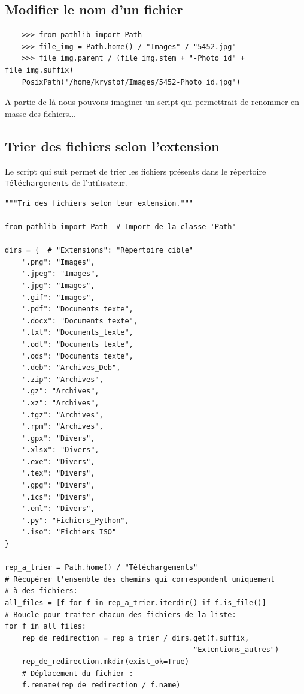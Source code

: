 \documentclass[a4paper,11pt]{book}
\begin{document}
\subsection*{Modifier le nom d'un fichier}
\begin{verbatim}
    >>> from pathlib import Path
    >>> file_img = Path.home() / "Images" / "5452.jpg"
    >>> file_img.parent / (file_img.stem + "-Photo_id" + file_img.suffix)
    PosixPath('/home/krystof/Images/5452-Photo_id.jpg')
\end{verbatim}
\medskip

A partie de là nous pouvons imaginer un script qui permettrait de renommer en masse des fichiers...
\medskip

\subsection*{Trier des fichiers selon l'extension}
Le script qui suit permet de trier les fichiers présents dans le répertoire \texttt{Téléchargements} de l'utilisateur.
\begin{lstlisting}[caption=Trier des fichiers]
"""Tri des fichiers selon leur extension."""

from pathlib import Path  # Import de la classe 'Path'

dirs = {  # "Extensions": "Répertoire cible"
    ".png": "Images",
    ".jpeg": "Images",
    ".jpg": "Images",
    ".gif": "Images",
    ".pdf": "Documents_texte",
    ".docx": "Documents_texte",
    ".txt": "Documents_texte",
    ".odt": "Documents_texte",
    ".ods": "Documents_texte",
    ".deb": "Archives_Deb",
    ".zip": "Archives",
    ".gz": "Archives",
    ".xz": "Archives",
    ".tgz": "Archives",
    ".rpm": "Archives",
    ".gpx": "Divers",
    ".xlsx": "Divers",
    ".exe": "Divers",
    ".tex": "Divers",
    ".gpg": "Divers",
    ".ics": "Divers",
    ".eml": "Divers",
    ".py": "Fichiers_Python",
    ".iso": "Fichiers_ISO"
}

rep_a_trier = Path.home() / "Téléchargements"
# Récupérer l'ensemble des chemins qui correspondent uniquement 
# à des fichiers:
all_files = [f for f in rep_a_trier.iterdir() if f.is_file()]
# Boucle pour traiter chacun des fichiers de la liste:
for f in all_files:
    rep_de_redirection = rep_a_trier / dirs.get(f.suffix, 
                                            "Extentions_autres")
    rep_de_redirection.mkdir(exist_ok=True)
    # Déplacement du fichier :
    f.rename(rep_de_redirection / f.name)  
\end{lstlisting}
\medskip
\end{document}
